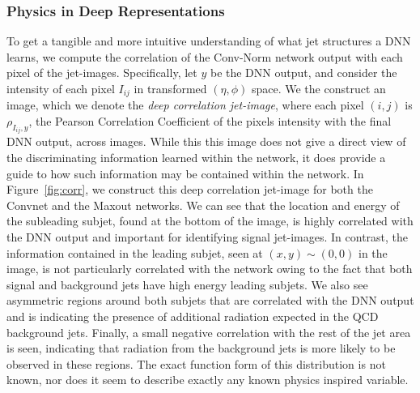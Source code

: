 \subsubsection{Physics in Deep Representations} %
\label{ssub:physics_in_deep_representations}
To get a tangible and more intuitive understanding of what jet structures a DNN learns, we compute the correlation of the Conv-Norm network output with each pixel of the jet-images. Specifically, let $y$ be the DNN output, and consider the intensity of each pixel $I_{ij}$ in transformed $(\eta, \phi)$ space. We the construct an image, which we denote the \emph{deep correlation jet-image}, where each pixel $(i, j)$ is $\rho_{I_{ij}, y}$, the Pearson Correlation Coefficient of the pixels intensity with the final DNN output, across images. While this this image does not give a direct view of the discriminating information learned within the network, it does provide a guide to how such information may be contained within the network.  In Figure~\ref{fig:corr}, we construct this deep correlation jet-image for both the Convnet and the Maxout networks.  We can see that the location and energy of the subleading subjet, found at the bottom of the image, is highly correlated with the DNN output and important for identifying signal jet-images.  In contrast, the information contained in the leading subjet, seen at $(x,y)\sim (0,0)$ in the image, is not particularly correlated with the network owing to the fact that both signal and background jets have high energy leading subjets.  We also see asymmetric regions around both subjets that are correlated with the DNN output and is indicating the presence of additional radiation expected in the QCD background jets.  Finally, a small negative correlation with the rest of the jet area is seen, indicating that radiation from the background jets is more likely to be observed in these regions.   The exact function form of this distribution is not known, nor does it seem to describe exactly any known physics inspired variable.

